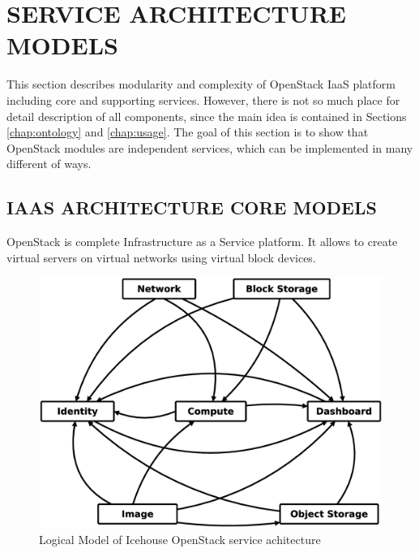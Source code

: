 
\section{SERVICE ARCHITECTURE MODELS}
\label{chap:service}



This section describes modularity and complexity of OpenStack IaaS platform including core and supporting services. However, there is not so much place for detail description of all components, since the main idea is contained in Sections \ref{chap:ontology} and \ref{chap:usage}. 
The goal of this section is to show that OpenStack modules are independent services, which can be implemented in many different of ways. 

\subsection{IAAS ARCHITECTURE CORE MODELS}

OpenStack is complete Infrastructure as a Service platform. It allows to create virtual servers on virtual networks using virtual block devices.

\begin{figure}[h]
\centering
\includegraphics[scale=.13]{img/openstack_logical_model.eps}
\caption{Logical Model of Icehouse OpenStack service achitecture}
\label{fig:modules}
\end{figure}

